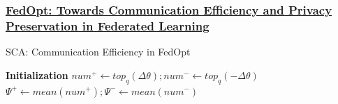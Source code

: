 \documentclass{beamer}
\begin{document}
    \begin{frame}
        \frametitle{
            \href{https://www.mdpi.com/2076-3417/10/8/2864}{
            FedOpt: Towards Communication Efficiency and Privacy Preservation in Federated Learning
            }
        }

        \begin{algorithm}[H]
      
                        
            \caption{SCA: Communication Efficiency in FedOpt}
            \label{alg1}
            \textbf{Initialization}\;
            $ num^+ \leftarrow top_{q}(\Delta \theta); num^- \leftarrow top_{q}(- \Delta \theta) $ \\
            $ \Psi^+ \leftarrow mean(num^+); \Psi^- \leftarrow mean(num^-) $ \\
        \end{algorithm}
    
    \end{frame}
\end{document}
